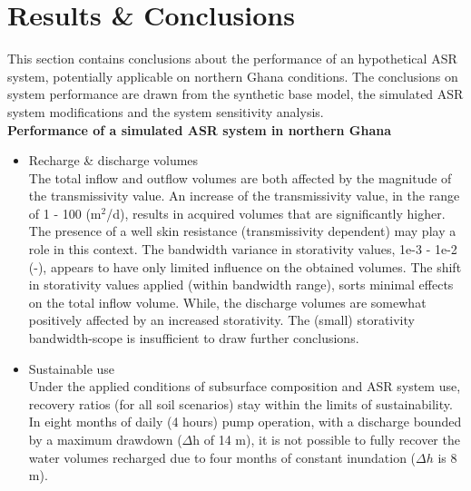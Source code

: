 \section{Results \& Conclusions}
\label{section:Upscaling_conclusions}
This section contains conclusions about the performance of an hypothetical  ASR system, potentially applicable on northern Ghana conditions. The conclusions on system performance are drawn from the synthetic base model, the simulated ASR system modifications and the system sensitivity analysis. \\


\textbf{Performance of a simulated ASR system in northern Ghana}
\begin{itemize}
\item{Recharge \& discharge volumes } \\
The total inflow and outflow volumes are both affected by the magnitude of the transmissivity value. An increase of the transmissivity value, in the range of 1 - 100 (m$^2$/d), results in acquired volumes that are significantly higher. The presence of a well skin resistance (transmissivity dependent) may play a role in this context. The bandwidth variance in storativity values, 1e-3 - 1e-2 (-), appears to have only limited influence on the obtained volumes. The shift in storativity values applied (within bandwidth range), sorts minimal effects on the total inflow volume. While, the discharge volumes are somewhat positively affected by an increased storativity. The (small) storativity bandwidth-scope is insufficient to draw further conclusions. 
\item{Sustainable use} \\
Under the applied conditions of subsurface composition and ASR system use,  recovery ratios (for all soil scenarios) stay within the limits of sustainability. In eight months of daily (4 hours) pump operation, with a discharge bounded by a maximum drawdown ($\Delta$h of 14 m), it is not possible to fully recover the water volumes recharged due to four months of constant inundation ($\Delta h$ is 8 m).
\end{itemize}

